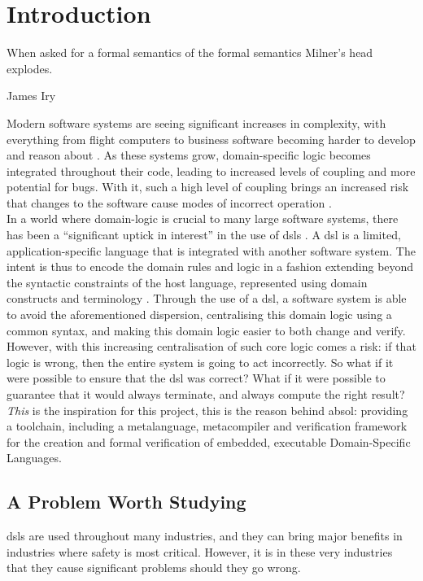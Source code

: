 \chapter{Introduction} %
\label{cha:introduction}
\epigraph{When asked for a formal semantics of the formal semantics Milner's head explodes.}{James Iry \citep{incomplete_iry}}

Modern software systems are seeing significant increases in complexity, with everything from flight computers to business software becoming harder to develop and reason about \citep{dvorak2009nasa}.
As these systems grow, domain-specific logic becomes integrated throughout their code, leading to increased levels of coupling and more potential for bugs.
With it, such a high level of coupling brings an increased risk that changes to the software cause modes of incorrect operation \citep{khawar2001developing}.\\

In a world where domain-logic is crucial to many large software systems, there has been a ``significant uptick in interest'' in the use of \glspl{dsl} \citep{fowler2010domain}.
A \gls{dsl} is a limited, application-specific language that is integrated with another software system.
The intent is thus to encode the domain rules and logic in a fashion extending beyond the syntactic constraints of the host language, represented using domain constructs and terminology \citep{Mernik:2005:DDL:1118890.1118892}.
Through the use of a \gls{dsl}, a software system is able to avoid the aforementioned dispersion, centralising this domain logic using a common syntax, and making this domain logic easier to both change and verify.\\

However, with this increasing centralisation of such core logic comes a risk: if that logic is wrong, then the entire system is going to act incorrectly.
So what if it were possible to ensure that the \gls{dsl} was correct?
What if it were possible to guarantee that it would always terminate, and always compute the right result?
\textit{This} is the inspiration for this project, this is the reason behind \gls{absol}: providing a toolchain, including a \gls{metalanguage}, \gls{metacompiler} and verification framework for the creation and formal verification of embedded, executable Domain-Specific Languages.

\section{A Problem Worth Studying} %
\label{sec:a_problem_worth_studying}
\glspl{dsl} are used throughout many industries, and they can bring major benefits in industries where safety is most critical.
However, it is in these very industries that they cause significant problems should they go wrong.\\

